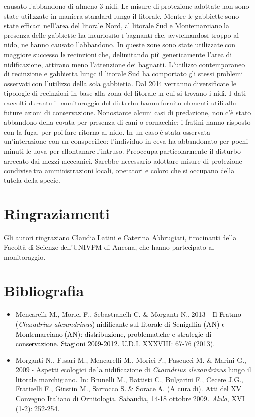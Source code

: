 causato l'abbandono di almeno 3 nidi. Le misure di
protezione adottate non sono state utilizzate in maniera standard lungo
il litorale. Mentre le gabbiette sono state efficaci
nell'area del litorale Nord, al litorale Sud e
Montemarciano la presenza delle gabbiette ha incuriosito i bagnanti
che, avvicinandosi troppo al nido, ne hanno causato
l'abbandono. In queste zone sono state utilizzate con
maggiore successo le recinzioni che, delimitando pi\`u genericamente
l'area di nidificazione, attirano meno
l{\textquoteright}attenzione dei bagnanti. L{\textquoteright}utilizzo
contemporaneo di recinzione e gabbietta lungo il litorale Sud ha
comportato gli stessi problemi osservati con l{\textquoteright}utilizzo
della sola gabbietta. Dal 2014 verranno diversificate le tipologie di
recinzioni in base alla zona del litorale in cui si trovano i nidi. I
dati raccolti durante il monitoraggio del disturbo hanno fornito
elementi utili alle future azioni di conservazione. Nonostante alcuni
casi di predazione, non c{\textquoteright}\`e stato abbandono della
covata per presenza di cani o cornacchie: i fratini hanno risposto con
la fuga, per poi fare ritorno al nido. In un caso \`e stata osservata
un'interazione con un conspecifico:
l'individuo in cova ha abbandonato per pochi minuti le
uova per allontanare l'intruso. Preoccupa
particolarmente il disturbo arrecato dai mezzi meccanici. Sarebbe
necessario adottare misure di protezione condivise tra amministrazioni
locali, operatori e coloro che si occupano della tutela della specie.

\section*{Ringraziamenti}
Gli autori ringraziano Claudia Latini e Caterina Abbrugiati, tirocinanti
della Facolt\`a di Scienze dell{\textquoteright}UNIVPM di Ancona, che
hanno partecipato al monitoraggio.

\section*{Bibliografia}
\begin{itemize}\itemsep0pt
	\item Mencarelli M., Morici F., Sebastianelli C. \& Morganti N., 2013 -
\textcolor{black}{Il Fratino (}\textit{\textcolor{black}{Charadrius
alexandrinus}}\textcolor{black}{) nidificante sul litorale di
Senigallia (AN) e Montemarciano (AN): distribuzione, problematiche e
strategie di conservazione. Stagioni 2009-2012. }U.D.I. XXXVIII: 67-76
(2013).

	\item Morganti N., Fusari M., Mencarelli M., Morici F., Pascucci M. \& Marini
G., 2009 - Aspetti ecologici della nidificazione di \textit{Charadrius
alexandrinus }lungo il litorale marchigiano. In: Brunelli M., Battisti
C., Bulgarini F., Cecere J.G., Fraticelli F., Giustin M., Sarrocco S.
\& Sorace A. (A cura di). Atti del XV Convegno Italiano di Ornitologia.
Sabaudia, 14-18 ottobre 2009\textit{. Alula}, XVI (1-2): 252-254.
\end{itemize}
